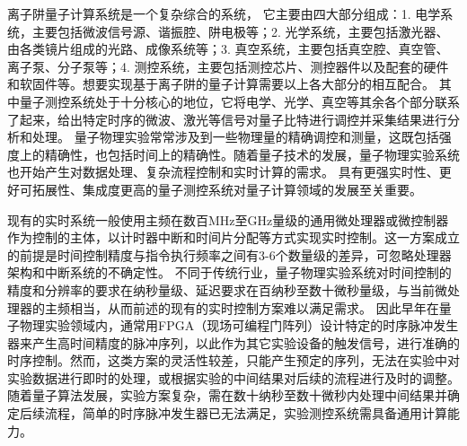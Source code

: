 
离子阱量子计算系统是一个复杂综合的系统，
它主要由四大部分组成：1.  电学系统，主要包括微波信号源、谐振腔、阱电极等；2. 光学系统，主要包括激光器、由各类镜片组成的光路、成像系统等；3. 真空系统，主要包括真空腔、真空管、离子泵、分子泵等；4. 测控系统，主要包括测控芯片、测控器件以及配套的硬件和软固件等。想要实现基于离子阱的量子计算需要以上各大部分的相互配合。
其中量子测控系统处于十分核心的地位，它将电学、光学、真空等其余各个部分联系了起来，给出特定时序的微波、激光等信号对量子比特进行调控并采集结果进行分析和处理。
量子物理实验常常涉及到一些物理量的精确调控和测量，这既包括强度上的精确性，也包括时间上的精确性。随着量子技术的发展，量子物理实验系统也开始产生对数据处理、复杂流程控制和实时计算的需求。
具有更强实时性、更好可拓展性、集成度更高的量子测控系统对量子计算领域的发展至关重要。

现有的实时系统一般使用主频在数百MHz至GHz量级的通用微处理器或微控制器作为控制的主体，以计时器中断和时间片分配等方式实现实时控制。这一方案成立的前提是时间控制精度与指令执行频率之间有3-6个数量级的差异，可忽略处理器架构和中断系统的不确定性。
不同于传统行业，量子物理实验系统对时间控制的精度和分辨率的要求在纳秒量级、延迟要求在百纳秒至数十微秒量级\cite[]{Ryan_Johnson_Ristè_Donovan_Ohki_2017,Guo_Qin_Schulz_2023,junhua03}，与当前微处理器的主频相当，从而前述的现有的实时控制方案难以满足需求。
因此早年在量子物理实验领域内，通常用FPGA（现场可编程门阵列）设计特定的时序脉冲发生器来产生高时间精度的脉冲序列，以此作为其它实验设备的触发信号，进行准确的时序控制。然而，这类方案的灵活性较差，只能产生预定的序列，无法在实验中对实验数据进行即时的处理，或根据实验的中间结果对后续的流程进行及时的调整\cite[]{junhua01}。随着量子算法发展，实验方案复杂，需在数十纳秒至数十微秒内处理中间结果并确定后续流程，简单的时序脉冲发生器已无法满足，实验测控系统需具备通用计算能力。

